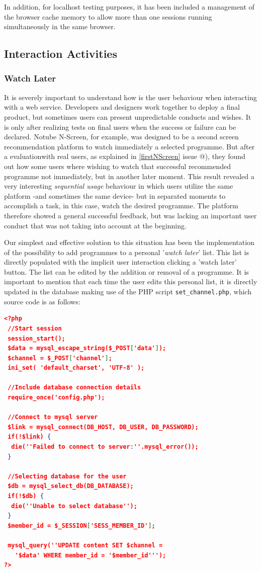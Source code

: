 \documentclass{acm_proc_article-sp}
\makeatletter
\newcommand*{\rom}[1]{\expandafter\@slowromancap\romannumeral #1@}
\makeatother
\begin{document}
In addition, for localhost testing purposes, it has been included a management of the browser cache memory to allow more than one sessions running simultaneously in the same browser.

\subsection{Interaction Activities}
\subsubsection{Watch Later} \label{watchlater}
It is severely important to understand how is the user behaviour when interacting with a web service. Developers and designers work together to deploy a final product, but sometimes users can present unpredictable conducts and wishes\cite{norman2002design}. It is only after realizing tests on final users when the success or failure can be declared. Notube N-Screen, for example, was designed to be a second screen recommendation platform to watch immediately a selected programme. But after a evaluationwith real users, as explained in \ref{firstNScreen} issue \rom{2}), they found out how some users where wishing to watch that successful recommended programme not immediately, but in another later moment. This result revealed a very interesting \textit{sequential usage} behaviour in which users utilize the same platform -and sometimes the same device- but in separated moments to accomplish a task, in this case, watch the desired programme. The platform therefore showed a general successful feedback, but was lacking an important user conduct that was not taking into account at the beginning. 

Our simplest and effective solution to this situation\cite{krug2014don} has been the implementation of the possibility to add programmes to a personal '\textit{watch later}' list. This list is directly populated with the implicit user interaction clicking a 'watch later' button. The list can be edited by the addition or removal of a programme. It is important to mention that each time the user edits this personal list, it is directly updated in the database making use of the PHP script \texttt{set\_channel.php}, which source code is as follows:

\begin{lstlisting}[language=json,firstnumber=1]
<?php
 //Start session
 session_start();
 $data = mysql_escape_string($_POST['data']);
 $channel = $_POST['channel'];
 ini_set( 'default_charset', 'UTF-8' );
	
 //Include database connection details
 require_once('config.php');

 //Connect to mysql server
 $link = mysql_connect(DB_HOST, DB_USER, DB_PASSWORD);
 if(!$link) {
  die(''Failed to connect to server:''.mysql_error());
 }
	
 //Selecting database for the user
 $db = mysql_select_db(DB_DATABASE);
 if(!$db) {
  die(''Unable to select database'');
 }
 $member_id = $_SESSION['SESS_MEMBER_ID'];

 mysql_query(''UPDATE content SET $channel = 
   '$data' WHERE member_id = '$member_id''');
?>
\end{lstlisting}
\end{document}

